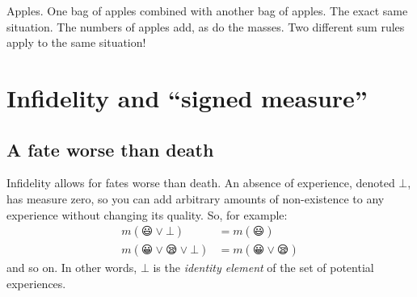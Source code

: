 \documentclass[a4paper, 12pt]{article}
\begin{document}
Apples.
One bag of apples combined with another bag of apples.
The exact same situation. The numbers of apples add, as
do the masses. Two different sum rules apply to the same
situation!


\section{Infidelity and ``signed measure''}

\subsection{A fate worse than death}

Infidelity allows for fates worse than death.
An absence of experience, denoted $\bot$,
has measure zero, so you can add arbitrary amounts
of non-existence to any experience without changing
its quality. So, for example:
\begin{align}
m(😃 \vee \bot)        &= m(😃)\\
m(😀 \vee 😪 \vee \bot) &= m(😀 \vee 😪)
\end{align}
and so on.
In other words, $\bot$ is the {\em identity element}
of the set of potential experiences.



\end{document}
